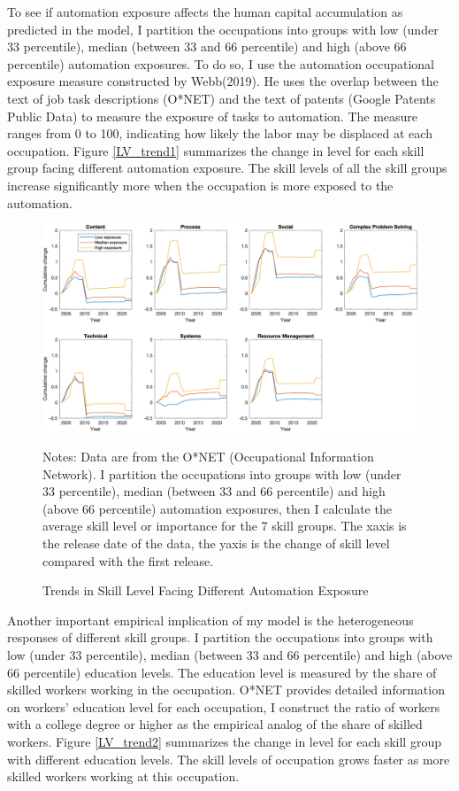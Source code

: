 \documentclass[12pt]{article}
\begin{document}
To see if automation exposure affects the human capital accumulation as predicted in the model, I partition the occupations into groups with low (under 33 percentile), median (between 33 and 66 percentile) and high (above 66 percentile) automation exposures. To do so, I use the automation occupational exposure measure constructed by Webb(2019)\nocite{Webb2019}. He uses the overlap between the text of job task descriptions (O*NET) and the text of patents (Google Patents Public Data) to measure the exposure of tasks to automation. The measure ranges from 0 to 100, indicating how likely the labor may be displaced at each occupation. Figure \ref{LV_trend1} summarizes the change in level for each skill group facing different automation exposure. The skill levels of all the skill groups increase significantly more when the occupation is more exposed to the automation. 

\begin{figure}[h!]
\includegraphics[width = \textwidth]{LV_trend1}
\caption{Trends in Skill Level Facing Different Automation Exposure}
\label{LV_trend}
{\scriptsize Notes: Data are from the O*NET (Occupational Information Network). I partition the occupations into groups with low (under 33 percentile), median (between 33 and 66 percentile) and high (above 66 percentile) automation exposures, then I calculate the average skill level or importance for the 7 skill groups. The xaxis is the release date of the data, the yaxis is the change of skill level compared with the first release. }
\end{figure}

Another important empirical implication of my model is the heterogeneous responses of different skill groups. I partition the occupations into groups with low (under 33 percentile), median (between 33 and 66 percentile) and high (above 66 percentile) education levels. The education level is measured by the share of skilled workers working in the occupation. O*NET provides detailed information on workers' education level for each occupation, I construct the ratio of workers with a college degree or higher as the empirical analog of the share of skilled workers. Figure \ref{LV_trend2} summarizes the change in level for each skill group with different education levels. The skill levels of occupation grows faster as more skilled workers working at this occupation. 
\end{document}
